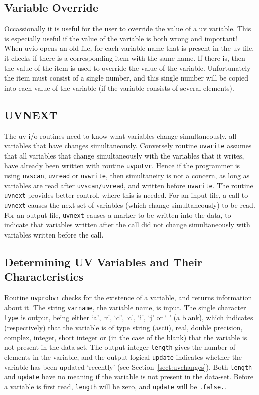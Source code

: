\documentclass{report}
\begin{document}
\subsection{Variable Override}
Occassionally it is useful for the user to override the value of a uv variable.
This is especially useful if the value of the variable is both wrong and
important! When uvio opens an old file, for each variable name that is
present in the uv file, it checks if there is a corresponding item with
the same name. If there is, then the value of the item is used to override the
value of the variable. Unfortunately the item must consist of a single
number, and this single number will be copied into each value of the variable
(if the variable consists of several elements).

\subsection{UVNEXT}\label{sect:uvnext}
The uv i/o routines need to know what variables change simultaneously.
all variables that have changes simultaneously. Conversely routine
{\tt uvwrite} assumes that all variables that change simultaneously with
the variables that it writes, have already been written with routine
{\tt uvputvr}. Hence if the programmer is using {\tt uvscan}, {\tt uvread} or
{\tt uvwrite}, then simultaneity is not a concern, as long as variables are
read after {\tt uvscan/uvread}, and written before {\tt uvwrite}. The routine
{\tt uvnext} provides better control, where this is needed. For an input
file, a call to {\tt uvnext} causes the next set of variables (which
change simultaneously) to be read. For an output file, {\tt uvnext} causes
a marker to be written into the data, to indicate that variables written
after the call did not change simultaneously with variables written before
the call.

\subsection{Determining UV Variables and Their Characteristics}
\label{sect:uvprobvr}
Routine {\tt uvprobvr} checks for the existence of a variable, and
returns information about it. The string {\tt varname}, the variable name,
is input. The single character {\tt type} is output, being either
`a', `r', `d', `c', `i', `j' or ` ' (a blank), which indicates (respectively)
that the variable is of type string (ascii),
real, double precision, complex, integer, short integer or (in the case of the
blank) that the variable is not present in the data-set.
The output integer {\tt length}
gives the number of elements in the variable, and the output logical
{\tt update} indicates whether the variable has been updated `recently' (see
Section~\ref{sect:uvchanges}).
Both {\tt length} and {\tt update} have no meaning if the variable is not
present in the data-set. Before a variable is first read,
{\tt length} will be zero, and {\tt update} will be {\tt .false.}.
\end{document}
